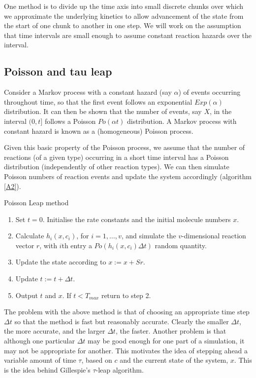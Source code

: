 \documentclass[12pt, DIV12]{scrartcl}
\begin{document}
One method is to divide up the time axis into small discrete chunks over which
we approximate the underlying kinetics to allow advancement of the state from
the start of one chunk to another in one step. We will work on the assumption
that time intervals are small enough to assume constant reaction hazards over
the interval.

\subsection{Poisson and tau leap}

Consider a Markov process with a constant hazard (say $\alpha$) of events
occurring throughout time, so that the first event follows an exponential
$Exp(\alpha)$ distribution. It can then be shown that the number of events, say
$X$, in the interval $(0,t]$ follows a Poisson $Po(\alpha t)$ distribution. A
Markov process with constant hazard is known as a (homogeneous) Poisson process.

Given this basic property of the Poisson process, we assume that the number of
reactions (of a given type) occurring in a short time interval has a Poisson
distribution (independently of other reaction types). We can then simulate
Poisson numbers of reaction events and update the system accordingly (algorithm \ref{A2}).
\begin{algorithm}[t]
\caption{Poisson Leap method}\label{A2}
\begin{enumerate}
\item Set $t=0$. Initialise the rate constants and the initial molecule numbers $x$.
\item Calculate $h_i(x,c_i)$, for $i=1,\ldots,v$, and simulate the
$v$-dimensional reaction vector $r$, with $i$th entry a
$Po(h_i(x,c_i)\Delta t)$ random quantity.
\item Update the state according to $x:=x+Sr$.
\item Update $t:=t+\Delta t$.
\item Output $t$ and $x$. If $t<T_{max}$ return to step 2.
\end{enumerate}
\end{algorithm}

The problem with the above method is that of choosing an appropriate time step
$\Delta t$ so that the method is fast but reasonably accurate. Clearly the
smaller $\Delta t$, the more accurate, and the larger $\Delta t$, the faster.
Another problem is that although one particular $\Delta t$ may be good enough
for one part of a simulation, it may not be appropriate for another. This
motivates the idea of stepping ahead a variable amount of time $\tau$, based on
$c$ and the current state of the system, $x$. This is the idea behind
Gillespie's $\tau$-leap algorithm.
\end{document}

